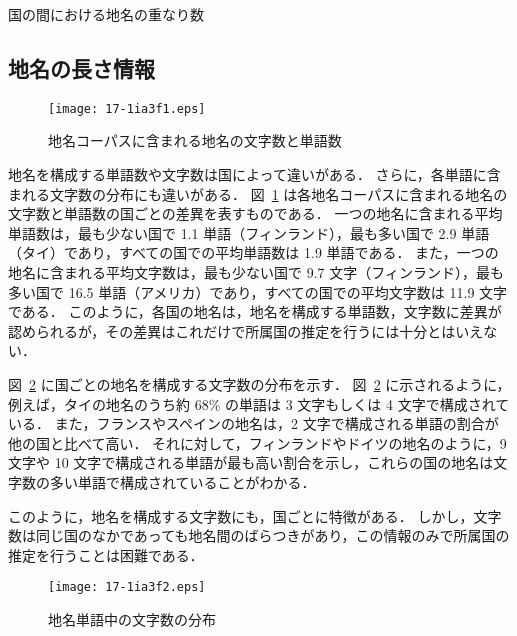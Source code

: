\documentclass[japanese]{jnlp_1.4}
\begin{document}
\begin{table}[b]
\vspace{-0.5\baselineskip}
  \caption{国の間における地名の重なり数}
  \label{tab:duplicated-toponyms}

\end{table}


\subsection{地名の長さ情報}
\label{sec:name-length-data}

\begin{figure}[b]
 \begin{center}
  \texttt{[image: 17-1ia3f1.eps]}
 \end{center}
  \caption{地名コーパスに含まれる地名の文字数と単語数}
  \label{fig:toponym-word-char-length}
\end{figure}

地名を構成する単語数や文字数は国によって違いがある．
さらに，各単語に含まれる文字数の分布にも違いがある．
図~\ref{fig:toponym-word-char-length} は各地名コーパスに含まれる地名の文字数と単語数の国ごとの差異を表すものである．
一つの地名に含まれる平均単語数は，最も少ない国で 1.1 単語（フィンランド），最も多い国で 2.9 単語（タイ）であり，すべての国での平均単語数は 1.9 単語である．
また，一つの地名に含まれる平均文字数は，最も少ない国で 9.7 文字（フィンランド），最も多い国で 16.5 単語（アメリカ）であり，すべての国での平均文字数は 11.9 文字である．
このように，各国の地名は，地名を構成する単語数，文字数に差異が認められるが，その差異はこれだけで所属国の推定を行うには十分とはいえない．

図~\ref{fig:toponym-word-length-distribution} に国ごとの地名を構成する文字数の分布を示す．
図~\ref{fig:toponym-word-length-distribution} に示されるように，例えば，タイの地名のうち約 68\% の単語は 3 文字もしくは 4 文字で構成されている．
また，フランスやスペインの地名は，2 文字で構成される単語の割合が他の国と比べて高い．
それに対して，フィンランドやドイツの地名のように，9 文字や 10 文字で構成される単語が最も高い割合を示し，これらの国の地名は文字数の多い単語で構成されていることがわかる．

このように，地名を構成する文字数にも，国ごとに特徴がある．
しかし，文字数は同じ国のなかであっても地名間のばらつきがあり，この情報のみで所属国の推定を行うことは困難である．

\begin{figure}[t]
 \begin{center}
  \texttt{[image: 17-1ia3f2.eps]}
 \end{center}
  \caption{地名単語中の文字数の分布}
  \label{fig:toponym-word-length-distribution}
\end{figure}
\end{document}
